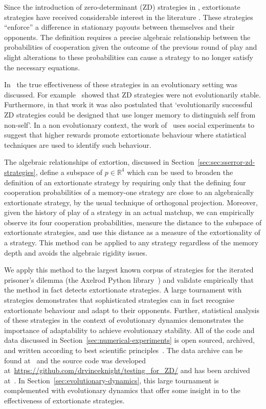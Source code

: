 \documentclass[a4paper]{article}
\begin{document}
Since the introduction of
zero-determinant (ZD) strategies in \cite{Press2012}, extortionate strategies have
received considerable interest in the literature \cite{hilbe2015partners}.
These strategies ``enforce'' a difference in stationary
payouts between themselves and their opponents. The definition requires a
precise algebraic relationship between the probabilities of cooperation given
the outcome of the previous round of play and slight alterations to these
probabilities can cause a strategy to no longer satisfy the necessary equations.

In~\cite{adami2013evolutionary, Hilbe2013, hilbe2013adaptive, hilbe2015partners,
ichinose2018zero, Moran1707} the true effectiveness of these strategies in an
evolutionary setting was discussed. For example~\cite{adami2013evolutionary}
showed that ZD strategies were not evolutionarily stable. Furthermore, in that
work it was also postulated that `evolutionarily successful ZD strategies could
be designed that use longer memory to distinguish self from non-self'. In a non
evolutionary context, the work of~\cite{becks2019extortion} uses social
experiments to suggest that higher rewards promote extortionate
behaviour where statistical techniques are used to identify such behaviour.

The algebraic relationships of extortion, discussed in
Section~\ref{sec:sec:sserror-zd-strategies}, define a subspace of
\(p\in\mathbb{R}^4\) which can be used to broaden the definition of an extortionate
strategy by requiring only that the defining four cooperation probabilities of a
memory-one strategy are close to an algebraically extortionate strategy, by the usual
technique of orthogonal projection. Moreover, given the history of play of a
strategy in an actual matchup, we can empirically observe its four
cooperation probabilities, measure the distance to the subspace of extortionate
strategies, and use this distance as a measure of the extortionality of a
strategy. This method can be applied to any strategy regardless of the memory
depth and avoids the algebraic rigidity issues.

We apply this method to the largest known corpus of strategies for the iterated
prisoner's dilemma (the Axelrod Python library~\cite{Knight2016, Knight2018})
and validate empirically that the method in fact detects extortionate strategies.
A large tournament with 
strategies demonstrates that sophisticated
strategies can in fact recognise extortionate behaviour and adapt to their
opponents. Further, statistical analysis of these strategies in the context of
evolutionary dynamics demonstrates the importance of adaptability to achieve
evolutionary stability. All of the code and data discussed in
Section~\ref{sec:numerical-experiments} is open sourced, archived, and written
according to best scientific principles~\cite{Wilson2014}. The data archive can
be found at~\cite{vincent_knight_2018_1297075} and the source code was developed
at~\url{https://github.com/drvinceknight/testing_for_ZD/} and has been archived
at~\cite{vincent_knight_2019_2598534}. In
Section~\ref{sec:evolutionary-dynamics}, this large tournament is complemented
with evolutionary dynamics that offer some insight in to the
effectiveness of extortionate strategies.
\end{document}

